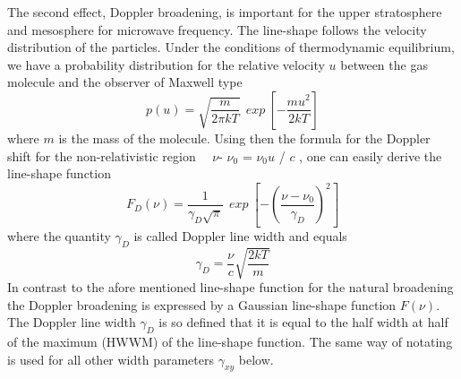 The second effect, Doppler broadening, is important for the upper
stratosphere and mesosphere for microwave frequency. The line-shape
follows the velocity distribution of the particles. Under the conditions
of thermodynamic equilibrium, we have  a probability distribution for
the relative velocity $u$ between the gas molecule and the observer 
of Maxwell type 
\begin{equation}
  p(u)=\sqrt{\frac{m}{2\pi kT}}~~exp~\left[-\frac{mu^2}{2kT}\right]
\label{}
\end{equation}
where $m$ is the mass of the molecule. Using then the formula for the
Doppler shift for the non-relativistic region~~  $\nu$- $\nu_0$ =
$\nu_0$$u$ / $c$ , one can easily derive the line-shape function 
\begin{equation}
 F_D(\nu)=\frac{1}{\gamma_D\sqrt{\pi}}~~exp~\left[-\left(\frac{\nu - \nu_0}{\gamma_D}\right)^2\right]
\label{}
\end{equation}
where the quantity $\gamma_D$ is called Doppler line width and equals
\begin{equation}
 \gamma_D=\frac{\nu}{c}\sqrt{\frac{2kT}{m}}
\label{}
\end{equation}
In contrast to the afore mentioned line-shape function for the natural
broadening the Doppler broadening is expressed by a Gaussian
line-shape function $F(\nu)$. The Doppler line width $\gamma_D$ is so
defined that it is equal to the half width at half of the maximum
(HWWM) of the line-shape function. The same way of notating is used
for all other width parameters $\gamma_{xy}$ below.

